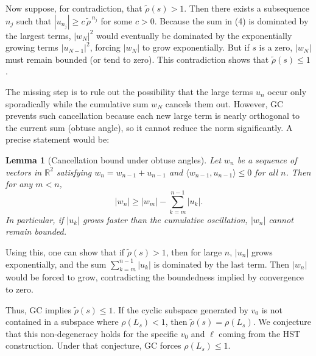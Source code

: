 \documentclass[11pt,a4paper]{article}
\newtheorem{lemma}[theorem]{Lemma}
\newcommand{\R}{\mathbb{R}}
\begin{document}
Now suppose, for contradiction, that $\tilde{\rho}(s) > 1$.  Then there exists a subsequence $n_j$ such that $|u_{n_j}| \ge c\, \tilde{\rho}^{\,n_j}$ for some $c>0$.  Because the sum in (4) is dominated by the largest terms, $|w_{N}|^2$ would eventually be dominated by the exponentially growing terms $|u_{N-1}|^2$, forcing $|w_N|$ to grow exponentially.  But if $s$ is a zero, $|w_N|$ must remain bounded (or tend to zero).  This contradiction shows that $\tilde{\rho}(s) \le 1$.

The missing step is to rule out the possibility that the large terms $u_n$ occur only sporadically while the cumulative sum $w_N$ cancels them out.  However, GC prevents such cancellation because each new large term is nearly orthogonal to the current sum (obtuse angle), so it cannot reduce the norm significantly.  A precise statement would be:

\begin{lemma}[Cancellation bound under obtuse angles]
Let $w_n$ be a sequence of vectors in $\R^2$ satisfying $w_n = w_{n-1} + u_{n-1}$ and $\langle w_{n-1}, u_{n-1} \rangle \le 0$ for all $n$.  Then for any $m < n$,
\[
|w_n| \ge |w_m| - \sum_{k=m}^{n-1} |u_k|.
\]
In particular, if $|u_k|$ grows faster than the cumulative oscillation, $|w_n|$ cannot remain bounded.
\end{lemma}

Using this, one can show that if $\tilde{\rho}(s) > 1$, then for large $n$, $|u_n|$ grows exponentially, and the sum $\sum_{k=m}^{n-1} |u_k|$ is dominated by the last term.  Then $|w_n|$ would be forced to grow, contradicting the boundedness implied by convergence to zero.

Thus, GC implies $\tilde{\rho}(s) \le 1$.  If the cyclic subspace generated by $v_0$ is not contained in a subspace where $\rho(L_s) < 1$, then $\tilde{\rho}(s) = \rho(L_s)$.  We conjecture that this non‑degeneracy holds for the specific $v_0$ and $\ell$ coming from the HST construction.  Under that conjecture, GC forces $\rho(L_s) \le 1$.
\end{document}
